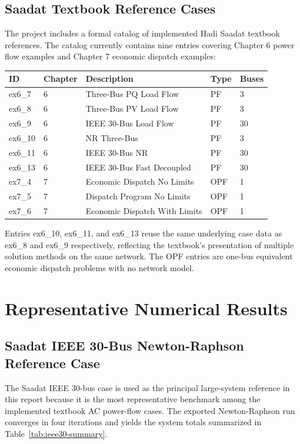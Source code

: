 \documentclass[12pt,a4paper]{article}
\begin{document}
\subsection{Saadat Textbook Reference Cases}

The project includes a formal catalog of implemented Hadi Saadat textbook references. The catalog currently contains nine entries covering Chapter 6 power flow examples and Chapter 7 economic dispatch examples:

\begin{center}
\begin{tabular}{lllll}
\toprule
ID & Chapter & Description & Type & Buses \\
\midrule
ex6\_7 & 6 & Three-Bus PQ Load Flow & PF & 3 \\
ex6\_8 & 6 & Three-Bus PV Load Flow & PF & 3 \\
ex6\_9 & 6 & IEEE 30-Bus Load Flow & PF & 30 \\
ex6\_10 & 6 & NR Three-Bus & PF & 3 \\
ex6\_11 & 6 & IEEE 30-Bus NR & PF & 30 \\
ex6\_13 & 6 & IEEE 30-Bus Fast Decoupled & PF & 30 \\
ex7\_4 & 7 & Economic Dispatch No Limits & OPF & 1 \\
ex7\_5 & 7 & Dispatch Program No Limits & OPF & 1 \\
ex7\_6 & 7 & Economic Dispatch With Limits & OPF & 1 \\
\bottomrule
\end{tabular}
\end{center}

Entries ex6\_10, ex6\_11, and ex6\_13 reuse the same underlying case data as ex6\_8 and ex6\_9 respectively, reflecting the textbook's presentation of multiple solution methods on the same network. The OPF entries are one-bus equivalent economic dispatch problems with no network model.

\section{Representative Numerical Results}

\subsection{Saadat IEEE 30-Bus Newton-Raphson Reference Case}

The Saadat IEEE 30-bus case is used as the principal large-system reference in this report because it is the most representative benchmark among the implemented textbook AC power-flow cases. The exported Newton-Raphson run converges in four iterations and yields the system totals summarized in Table~\ref{tab:ieee30-summary}.
\end{document}
